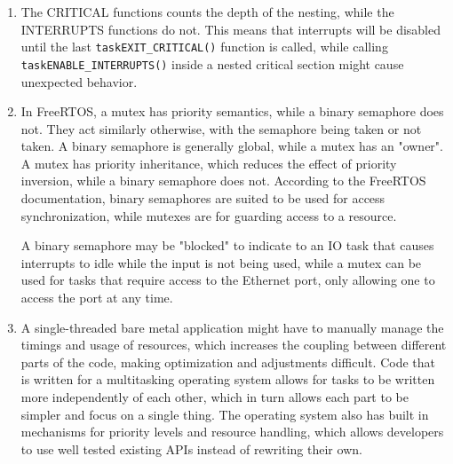 \documentclass{article}
\begin{document}
\begin{enumerate}
\item The CRITICAL functions counts the depth of the nesting, while the INTERRUPTS functions do not. This means that interrupts will be disabled until the last \verb|taskEXIT_CRITICAL()| function is called, while calling \verb|taskENABLE_INTERRUPTS()| inside a nested critical section might cause unexpected behavior.
\item In FreeRTOS, a mutex has priority semantics, while a binary semaphore does not. They act similarly otherwise, with the semaphore being taken or not taken. A binary semaphore is generally global, while a mutex has an "owner". A mutex has priority inheritance, which reduces the effect of priority inversion, while a binary semaphore does not. According to the FreeRTOS documentation, binary semaphores are suited to be used for access synchronization, while mutexes are for guarding access to a resource.

A binary semaphore may be "blocked" to indicate to an IO task that causes interrupts to idle while the input is not being used, while a mutex can be used for tasks that require access to the Ethernet port, only allowing one to access the port at any time.
\item A single-threaded bare metal application might have to manually manage the timings and usage of resources, which increases the coupling between different parts of the code, making optimization and adjustments difficult. Code that is written for a multitasking operating system allows for tasks to be written more independently of each other, which in turn allows each part to be simpler and focus on a single thing. The operating system also has built in mechanisms for priority levels and resource handling, which allows developers to use well tested existing APIs instead of rewriting their own.
\end{enumerate}
\end{document}

